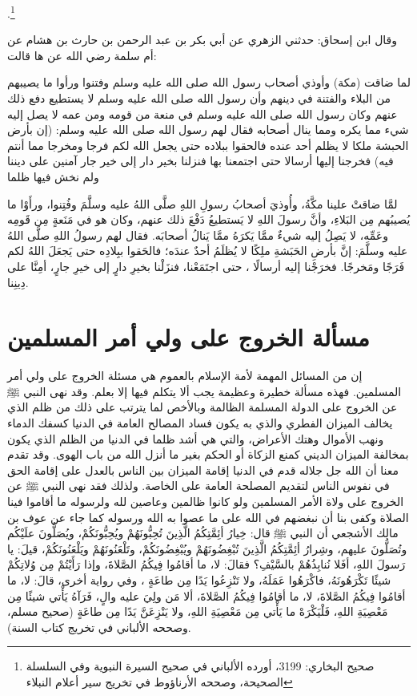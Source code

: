 \href{https://shamela.ws/book/592/187#p5}{\faExternalLink} \cite{bukhari}.\footnote{صحيح البخاري: 3199، أورده الألباني في صحيح السيرة النبوية وفي السلسلة الصحيحة، وصححه الأرناؤوط في تخريج سير أعلام النبلاء}


وقال ابن إسحاق: حدثني الزهري عن أبي بكر بن عبد الرحمن بن حارث بن هشام عن أم سلمة رضي الله عن ها قالت:



لما ضاقت (مكة) وأوذي أصحاب رسول الله صلى الله عليه وسلم وفتنوا ورأوا ما يصيبهم من البلاء والفتنة في دينهم وأن رسول الله صلى الله عليه وسلم لا يستطيع دفع ذلك عنهم وكان رسول الله صلى الله عليه وسلم في منعة من قومه ومن عمه لا يصل إليه شيء مما يكره ومما ينال أصحابه فقال لهم رسول الله صلى الله عليه وسلم: (إن بأرض الحبشة ملكا لا يظلم أحد عنده فالحقوا ببلاده حتى يجعل الله لكم فرجا ومخرجا مما أنتم فيه) فخرجنا إليها أرسالا حتى اجتمعنا بها فنزلنا بخير دار إلى خير جار آمنين على ديننا ولم نخش فيها ظلما


لمَّا ضاقتْ علينا مكَّةُ، وأُوذيَ أصحابُ رسولِ اللهِ صلَّى اللهُ عليه وسلَّمَ وفُتِنوا، ورأَوْا ما يُصيبُهم مِن البَلاءِ، وأنَّ رسولَ اللهِ لا يَستطيعُ دَفْعَ ذلك عنهم، وكان هو في مَنَعةٍ مِن قَومِه وعَمِّه، لا يَصِلُ إليه شيءٌ ممَّا يَكرَهُ ممَّا يَنالُ أصحابَه. فقال لهم رسولُ اللهِ صلَّى اللهُ عليه وسلَّمَ: إنَّ بأرضِ الحَبَشةِ ملِكًا لا يُظلَمُ أحدٌ عندَه؛ فالحَقوا ببِلادِه حتى يَجعَلَ اللهُ لكم فَرَجًا ومَخرجًا. فخرَجْنا إليه أرسالًا ، حتى اجتَمَعْنا، فنزَلْنا بخيرِ دارٍ إلى خيرِ جارٍ، أمِنَّا على دِينِنا.

\section{مسألة الخروج على ولي أمر المسلمين}
\label{sec:app_rebellion}

إن من المسائل المهمة لأمة الإسلام بالعموم هي مسئلة الخروج على ولي أمر المسلمين. فهذه مسألة خطيرة وعظيمة يجب ألا يتكلم فيها إلا بعلم. 
وقد نهى النبي ﷺ عن الخروج على الدولة المسلمة الظالمة وبالأخص لما يترتب على ذلك من ظلم الذي يخالف الميزان الفطري والذي به يكون فساد المصالح العامة في الدنيا كسفك الدماء ونهب الأموال وهتك الأعراض، والتي هي أشد ظلما في الدنيا من الظلم الذي يكون بمخالفة الميزان الديني كمنع الزكاة أو الحكم بغير ما أنزل الله من باب الهوى. وقد تقدم معنا أن الله جل جلاله قدم في الدنيا إقامة الميزان بين الناس بالعدل على إقامة الحق في نفوس الناس لتقديم المصلحة العامة على الخاصة. ولذلك فقد نهى النبي ﷺ عن الخروج على ولاة الأمر المسلمين ولو كانوا ظالمين وعاصين لله ولرسوله  ما أقاموا فينا الصلاة وكفى بنا أن نبغضهم في الله على ما عصوا به الله ورسوله كما جاء عن عوف بن مالك الأشجعي أن النبي ﷺ قال: خِيارُ أئِمَّتِكُمُ الَّذِينَ تُحِبُّونَهُمْ ويُحِبُّونَكُمْ، ويُصَلُّونَ علَيْكُم وتُصَلُّونَ عليهم، وشِرارُ أئِمَّتِكُمُ الَّذِينَ تُبْغِضُونَهُمْ ويُبْغِضُونَكُمْ، وتَلْعَنُونَهُمْ ويَلْعَنُونَكُمْ، قيلَ: يا رَسولَ اللهِ، أفَلا نُنابِذُهُمْ بالسَّيْفِ؟ فقالَ: لا، ما أقامُوا فِيكُمُ الصَّلاةَ، وإذا رَأَيْتُمْ مِن وُلاتِكُمْ شيئًا تَكْرَهُونَهُ، فاكْرَهُوا عَمَلَهُ، ولا تَنْزِعُوا يَدًا مِن طاعَةٍ ، وفي رواية أخرى، قالَ: لا، ما أقامُوا فِيكُمُ الصَّلاةَ، لا، ما أقامُوا فِيكُمُ الصَّلاةَ، ألا مَن ولِيَ عليه والٍ، فَرَآهُ يَأْتي شيئًا مِن مَعْصِيَةِ اللهِ، فَلْيَكْرَهْ ما يَأْتي مِن مَعْصِيَةِ اللهِ، ولا يَنْزِعَنَّ يَدًا مِن طاعَةٍ {\footnotesize (صحيح مسلم، وصححه الألباني في تخريج كتاب السنة)}. 


